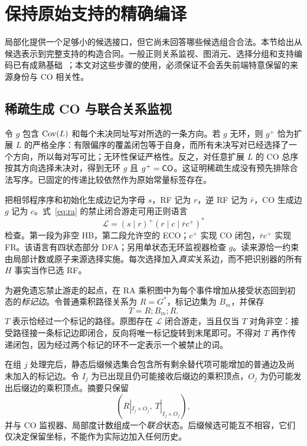 \section{保持原始支持的精确编译}\label{sec:compile}
局部化提供一个足够小的候选接口，但它尚未回答哪些候选组合合法。本节给出从候选表示到完整支持的构造合同。一般正则关系监视、图消元、选择分组和支持编码已有成熟基础~\cite{kater2023,kucera2021}；本文对这些步骤的使用，必须保证不会丢失前端特意保留的来源身份与 CO 相关性。

\subsection{稀疏生成 CO 与联合关系监视}
令 $g$ 包含 $\mathop{\mathrm{Cov}}(L)$ 和每个未决同址写对所选的一条方向。若 $g$ 无环，则 $g^+$ 恰为扩展 $L$ 的严格全序：有限偏序的覆盖闭包等于自身，而所有未决写对已经选择了一个方向，所以每对写可比；无环性保证严格性。反之，对任意扩展 $L$ 的 CO 总序按其方向选择未决对，得到无环 $g$ 且 $g^+=\mathsf{CO}$。这证明稀疏生成没有预先排除合法写序。已固定的传递比较依然作为原始常量标签存在。

把相邻程序序和初始化生成边记为字母 $s$，RF 记为 $r$，逆 RF 记为 $\bar r$，CO 生成边 $g$ 记为 $c$。式~\eqref{eq:ra} 的禁止闭合游走可用正则语言
\begin{equation}
 \mathcal L=(s\mid r)^+(r\mid c\mid\bar r c^+)^*\label{eq:lang}
\end{equation}
检查。第一段为非空 HB，第二段允许空的 ECO；$c^+$ 实现 CO 闭包，$\bar r c^+$ 实现 FR。该语言有四状态部分 DFA；另用单状态无环监视器检查 $g$。读来源恰一约束由局部计数或原子来源选择实施。每次选择加入\emph{真实}关系边，而不把识别器的所有 $H$ 事实当作已选 RF。

为避免遗忘禁止游走的起点，在 RA 乘积图中为每个事件增加从接受状态回到初态的\emph{标记边}。令普通乘积路径关系为 $R=G^*$，标记边集为 $B_m$，并保存
\[
 T=R;B_m;R.
\]
$T$ 表示恰经过一个标记的路径。原图存在 $\mathcal L$ 闭合游走，当且仅当 $T$ 对角非空：接受路径接一条标记边即闭合，反向将唯一标记旋转到末尾即可。不得对 $T$ 再作传递闭包，因为经过两个标记的环不一定表示一个被禁止的词。

在组 $j$ 处理完后，静态后缀候选集合包含所有剩余替代项可能增加的普通边及尚未加入的标记边。令 $I_j$ 为已出现且仍可能接收后缀边的乘积顶点，$O_j$ 为仍可能发出后缀边的乘积顶点。摘要只保留
\begin{equation}
 \left(R|_{I_j\times O_j},\ T|_{I_j\times O_j}\right),\label{eq:ports}
\end{equation}
并与 CO 监视器、局部度计数组成一个\emph{联合}状态。后缀候选可能互不相容，它们仅决定保留坐标，不能作为实际边加入任何历史。

